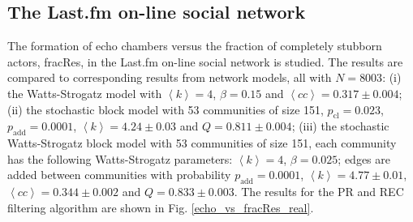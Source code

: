 \documentclass[11 pt , letterpaper , twoside , openright]{book}
\begin{document}
\subsection{The Last.fm on-line social network}

The formation of echo chambers versus the fraction of completely stubborn actors, fracRes, in the Last.fm on-line social network is studied. The results are compared to corresponding results from network models, all with $N = 8003$: (i) the Watts-Strogatz model with $\left<k\right> = 4$, $\beta = 0.15$ and $\left<cc\right> = 0.317 \pm 0.004$; (ii) the stochastic block model with 53 communities of size 151, $p_\text{cl} = 0.023$, $p_\text{add} = 0.0001$, $\left<k\right> = 4.24 \pm 0.03$ and $Q = 0.811 \pm 0.004$; (iii) the stochastic Watts-Strogatz block model with 53 communities of size 151, each community has the following Watts-Strogatz parameters: $\left<k\right> = 4$, $\beta = 0.025$; edges are added between communities with probability $p_\text{add} = 0.0001$, $\left<k\right> = 4.77 \pm 0.01$, $\left<cc\right> = 0.344 \pm 0.002$ and $Q = 0.833 \pm 0.003$. The results for the PR and REC filtering algorithm are shown in Fig. \ref{echo_vs_fracRes_real}.\\
\newline
\end{document}

